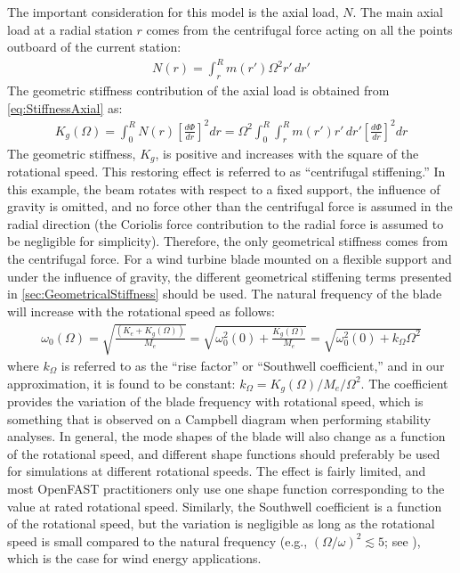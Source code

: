 \documentclass[wes, manuscript]{copernicus}
\begin{document}
The important consideration for this model is the axial load, $N$.
The main axial load at a radial station $r$ comes from the centrifugal force acting on all the points outboard of the current station:
\begin{align}
    N(r)=\int_r^R m(r') \Omega^2  r' \, dr'
\end{align}
The geometric stiffness contribution of the axial load is obtained from \autoref{eq:StiffnessAxial} as:
\begin{align}
    K_g(\Omega) = \int_0^R N(r) \left[\frac{d\Phi}{dr} \right]^2  dr  
    = \Omega^2 \int_0^R \int_r^R m(r') r' \, dr'
 \left[\frac{d\Phi}{dr} \right]^2 dr  
 \label{eq:GeomStiffCentri}
\end{align}
% 
The geometric stiffness, $K_g$, is positive and increases with the square of the rotational speed. 
This restoring effect is referred to as ``centrifugal stiffening.''
In this example, the beam rotates with respect to a fixed support, the influence of gravity is omitted, and no force other than the centrifugal force is assumed in the radial direction 
(the Coriolis force contribution to the radial force is assumed to be negligible for simplicity).
Therefore, the only geometrical stiffness comes from the centrifugal force.
For a wind turbine blade mounted on a flexible support and under the influence of gravity, the different geometrical stiffening terms presented in \autoref{sec:GeometricalStiffness} should be used.
The natural frequency of the blade will increase with the rotational speed as follows:
\begin{align}
   \omega_0(\Omega)=\sqrt{\frac{(K_{e}+ K_g(\Omega))}{M_e}} 
   = \sqrt{ \omega_0^2(0) + \frac{K_g(\Omega)}{M_e} } 
   = \sqrt{ \omega_0^2(0) +  k_\Omega \Omega^2 } 
\end{align}
where $k_\Omega$ is referred to as the ``rise factor'' or ``Southwell coefficient,'' and in our approximation, it is found to be constant: $k_\Omega=K_g(\Omega)/M_e/\Omega^2$.
The coefficient provides the variation of the blade frequency with rotational speed, which is something that is observed on a Campbell diagram when performing stability analyses.
In general, the mode shapes of the blade will also change as a function of the rotational speed, and different shape functions should preferably be used for simulations at different rotational speeds.
The effect is fairly limited, and most OpenFAST practitioners only use one shape function corresponding to the value at rated rotational speed.
Similarly, the Southwell coefficient is a function of the rotational speed, but the variation is negligible as long as the rotational speed is small compared to the natural frequency (e.g., $(\Omega/\omega)^2 \lesssim 5$; see \cite{bielawa:2006:book}), which is the case for wind energy applications.
\end{document}
